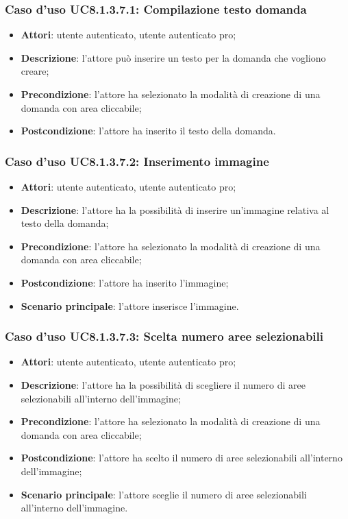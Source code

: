 \subsubsection{Caso d'uso UC8.1.3.7.1: Compilazione testo domanda}
\begin{itemize}
	\item \textbf{Attori}: utente autenticato, utente autenticato pro;
	\item \textbf{Descrizione}: l'attore può inserire un testo per la domanda che vogliono creare;
	\item \textbf{Precondizione}: l'attore ha selezionato la modalità di creazione di una domanda con area cliccabile;
	\item \textbf{Postcondizione}: l'attore ha inserito il testo della domanda.
\end{itemize}

\subsubsection{Caso d'uso UC8.1.3.7.2: Inserimento immagine}
\begin{itemize}
	\item \textbf{Attori}: utente autenticato, utente autenticato pro;
	\item \textbf{Descrizione}: l'attore ha la possibilità di inserire un'immagine relativa al testo della domanda;
	\item \textbf{Precondizione}: l'attore ha selezionato la modalità di creazione di una domanda con area cliccabile; 
	\item \textbf{Postcondizione}: l'attore ha inserito l'immagine;
	\item \textbf{Scenario principale}: l'attore inserisce l'immagine. 	
\end{itemize}

\subsubsection{Caso d'uso UC8.1.3.7.3: Scelta numero aree selezionabili}
\begin{itemize}
	\item \textbf{Attori}: utente autenticato, utente autenticato pro;
	\item \textbf{Descrizione}: l'attore ha la possibilità di scegliere il numero di aree selezionabili all'interno dell'immagine;
	\item \textbf{Precondizione}: l'attore ha selezionato la modalità di creazione di una domanda con area cliccabile; 
	\item \textbf{Postcondizione}: l'attore ha scelto il numero di aree selezionabili all'interno dell'immagine;
	\item \textbf{Scenario principale}: l'attore sceglie il numero di aree selezionabili all'interno dell'immagine. 	
\end{itemize}

